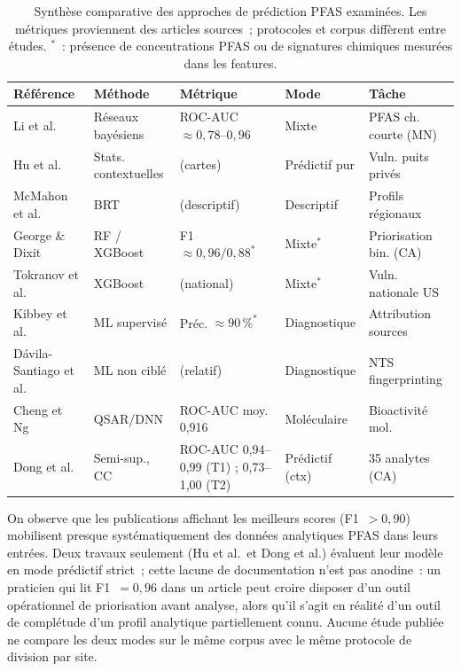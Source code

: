 \begin{table}[h!]
    \centering
    \caption{Synth\`ese comparative des approches de pr\'ediction PFAS examin\'ees. Les m\'etriques proviennent des articles sources~; protocoles et corpus diff\`erent entre \'etudes. $^*$~: pr\'esence de concentrations PFAS ou de signatures chimiques mesur\'ees dans les features.}
    \label{tab:chap2-comparatif}
    \small
    \begin{tabular}{p{2.6cm}p{2.8cm}p{2.4cm}p{1.6cm}p{2.6cm}}
        \hline
        R\'ef\'erence & M\'ethode & M\'etrique & Mode & T\^ache \\
        \hline
        Li et al.~\cite{li2022pfas} & R\'eseaux bay\'esiens & ROC-AUC $\approx 0{,}78$--$0{,}96$ & Mixte & PFAS ch. courte (MN) \\
        Hu et al.~\cite{hu2021privatewells} & Stats. contextuelles & (cartes) & Pr\'edictif pur & Vuln. puits priv\'es \\
        McMahon et al.~\cite{mcmahon2022pfas} & BRT & (descriptif) & Descriptif & Profils r\'egionaux \\
        George \& Dixit~\cite{george2021pfas} & RF / XGBoost & F1 $\approx 0{,}96/0{,}88^*$ & Mixte$^*$ & Priorisation bin. (CA) \\
        Tokranov et al.~\cite{tokranov2024pfas} & XGBoost & (national) & Mixte$^*$ & Vuln. nationale US \\
        Kibbey et al.~\cite{kibbey2020pfas} & ML supervis\'e & Pr\'ec. $\approx 90\,\%^*$ & Diagnostique & Attribution sources \\
        D\'avila-Santiago et al.~\cite{davilasantiago2022} & ML non cibl\'e & (relatif) & Diagnostique & NTS fingerprinting \\
        Cheng et Ng~\cite{cheng2019pfas} & QSAR/DNN & ROC-AUC moy. 0{,}916 & Mol\'eculaire & Bioactivit\'e mol. \\
        Dong et al.~\cite{dong2024pfas} & Semi-sup., CC & ROC-AUC 0{,}94--0{,}99 (T1) ; 0{,}73--1{,}00 (T2) & Pr\'edictif (ctx) & 35 analytes (CA) \\
        \hline
    \end{tabular}
\end{table}

On observe que les publications affichant les meilleurs scores (F1~$> 0{,}90$) mobilisent presque syst\'ematiquement des donn\'ees analytiques PFAS dans leurs entr\'ees.
Deux travaux seulement (Hu et al.\ et Dong et al.) \'evaluent leur mod\`ele en mode pr\'edictif strict~; cette lacune de documentation n'est pas anodine~: un praticien qui lit F1~$= 0{,}96$ dans un article peut croire disposer d'un outil op\'erationnel de priorisation avant analyse, alors qu'il s'agit en r\'ealit\'e d'un outil de compl\'etude d'un profil analytique partiellement connu.
Aucune \'etude publi\'ee ne compare les deux modes sur le m\^eme corpus avec le m\^eme protocole de division par site.


